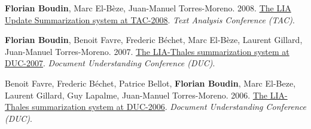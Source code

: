 \item 
\textbf{Florian Boudin}, Marc El-Bèze, Juan-Manuel Torres-Moreno.
2008.
\href{https://www.nist.gov/tac/publications/2008/participant.papers/LIA.proceedings.pdf}{The LIA Update Summarization system at TAC-2008}.
\textit{Text Analysis Conference (TAC)}.
\label{boudin-etal-2008-lia}

\item 
\textbf{Florian Boudin}, Benoit Favre, Frederic Béchet, Marc El-Bèze, Laurent Gillard, Juan-Manuel Torres-Moreno.
2007.
\href{http://www-nlpir.nist.gov/projects/duc/pubs/2007papers/uavignon.ps}{The LIA-Thales summarization system at DUC-2007}.
\textit{Document Understanding Conference (DUC)}.
\label{boudin-etal-2007-lia}

\item 
Benoit Favre, Frederic Béchet, Patrice Bellot, \textbf{Florian Boudin}, Marc El-Beze, Laurent Gillard, Guy Lapalme, Juan-Manuel Torres-Moreno.
2006.
\href{http://www-nlpir.nist.gov/projects/duc/pubs/2006papers/LIA-Thales_Duc06_final.pdf}{The LIA-Thales summarization system at DUC-2006}.
\textit{Document Understanding Conference (DUC)}.
\label{favre-etal-2006-lia}